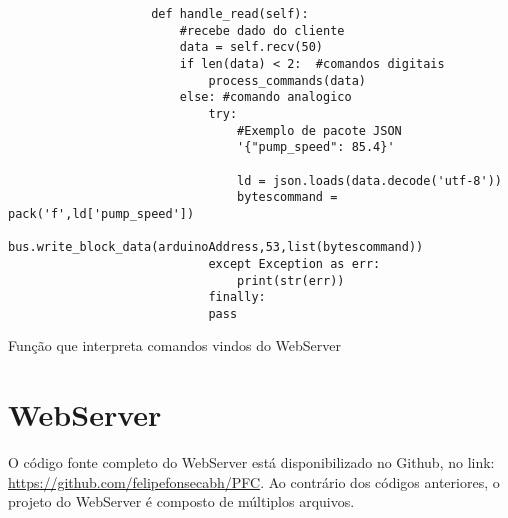 				\begin{listing}[!htb]
					\begin{verbatim}
					def handle_read(self):
						#recebe dado do cliente
						data = self.recv(50)
						if len(data) < 2:  #comandos digitais
							process_commands(data)
						else: #comando analogico
							try:
								#Exemplo de pacote JSON
								'{"pump_speed": 85.4}'
								
								ld = json.loads(data.decode('utf-8'))
								bytescommand = pack('f',ld['pump_speed'])
								bus.write_block_data(arduinoAddress,53,list(bytescommand))
							except Exception as err:
								print(str(err))
							finally:
							pass
					\end{verbatim}
					\caption{Função que interpreta comandos vindos do WebServer}
					\label{cod:handle_read}
				\end{listing}
			
			\section{WebServer}
				O código fonte completo do WebServer está disponibilizado no Github, no link: \url{https://github.com/felipefonsecabh/PFC}. Ao contrário dos códigos anteriores, o projeto do WebServer é composto de múltiplos arquivos.
				